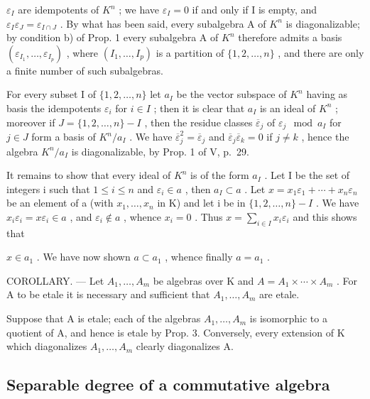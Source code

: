 \(\varepsilon_{I}\) are idempotents of \(K^{n}\) ; we have \(\varepsilon_{I}=0\) if and only if I is empty, and \(\varepsilon_{I}\varepsilon_{J}=\varepsilon_{I\cap J}\) . By what has been said, every subalgebra A of \(K^{n}\) is diagonalizable; by condition b) of Prop. 1 every subalgebra A of \(K^{n}\) therefore admits a basis \((\varepsilon_{I_{1}},\ldots,\varepsilon_{I_{p}})\) , where \((I_{1},\ldots,I_{p})\) is a partition of \(\{1,2,\ldots,n\}\) , and there are only a finite number of such subalgebras.

For every subset I of \(\{1,2,\ldots,n\}\) let \(a_{I}\) be the vector subspace of \(K^{n}\) having as basis the idempotents \(\varepsilon_{i}\) for \(i\in I\) ; then it is clear that \(a_{I}\) is an ideal of \(K^{n}\) ; moreover if \(J=\{1,2,\ldots,n\}-I\) , then the residue classes \(\overline{\varepsilon}_{j}\) of \(\varepsilon_{j} \mod a_{I}\) for \(j\in J\) form a basis of \(K^{n}/a_{I}\) . We have \(\overline{\varepsilon}_{j}^{2}=\overline{\varepsilon}_{j}\) and \(\overline{\varepsilon}_{j}\overline{\varepsilon}_{k}=0\) if \(j\neq k\) , hence the algebra \(K^{n}/a_{I}\) is diagonalizable, by Prop. 1 of V, p.~29.

It remains to show that every ideal of \(K^{n}\) is of the form \(a_{I}\) . Let I be the set of integers i such that \(1 \leqslant i \leqslant n\) and \(\varepsilon_{i} \in a\) , then \(a_{I} \subset a\) . Let \(x = x_{1}\varepsilon_{1} + \cdots + x_{n}\varepsilon_{n}\) be an element of a (with \(x_{1}, \ldots, x_{n}\) in K) and let i be in \(\{1, 2, \ldots, n\} - I\) . We have \(x_{i}\varepsilon_{i} = x\varepsilon_{i} \in a\) , and \(\varepsilon_{i} \notin a\) , whence \(x_{i} = 0\) . Thus \(x = \sum_{i \in I} x_{i}\varepsilon_{i}\) and this shows that

\(x \in a_{1}\) . We have now shown \(a \subset a_{1}\) , whence finally \(a = a_{1}\) .

COROLLARY. --- Let \(A_{1}, \ldots, A_{m}\) be algebras over K and \(A = A_{1} \times \cdots \times A_{m}\) . For A to be etale it is necessary and sufficient that \(A_{1}, \ldots, A_{m}\) are etale.

Suppose that A is etale; each of the algebras \(A_{1}, \ldots, A_{m}\) is isomorphic to a quotient of A, and hence is etale by Prop. 3. Conversely, every extension of K which diagonalizes \(A_{1}, \ldots, A_{m}\) clearly diagonalizes A.

\subsection{Separable degree of a commutative algebra}


